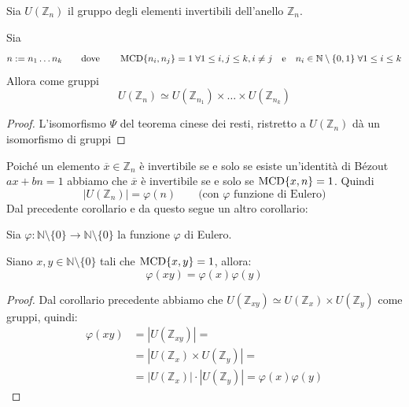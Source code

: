 \documentclass[../main.tex]{subfiles}
\begin{document}
\begin{corollary}
    Sia $U(\mathbb{Z}_n)$ il gruppo degli elementi invertibili dell'anello $\mathbb{Z}_n$.

    Sia
    \[
        n := n_1 \ldots n_k \qquad \text{dove} \qquad \operatorname{MCD}\{n_i, n_j\} = 1 \; \forall 1 \leq i,j \leq k, i \neq j \quad \text{e} \quad n_i \in \mathbb{N} \setminus \{0,1\} \;  \forall 1 \leq i \leq k
    \]
    Allora come gruppi
    \begin{equation*}
        U(\mathbb{Z}_n) \simeq U(\mathbb{Z}_{n_1}) \times \ldots \times U(\mathbb{Z}_{n_k})
    \end{equation*}
\end{corollary}
\begin{proof}
    L'isomorfismo $\Psi$ del teorema cinese dei resti, ristretto a $U(\mathbb{Z}_n)$ dà un isomorfismo di gruppi
\end{proof}

Poiché un elemento $\overline{x} \in \mathbb{Z}_n$ è invertibile se e solo se esiste un'identità di Bézout $ax + bn = 1$ abbiamo che $\overline{x}$ è invertibile se e solo se $\operatorname{MCD}\{x,n\} = 1$. Quindi
\begin{equation*}
    |U(\mathbb{Z}_n)| = \varphi(n) \qquad \text{(con $\varphi$ funzione di Eulero)}
\end{equation*}
Dal precedente corollario e da questo segue un altro corollario:

\begin{corollary}
    Sia $\varphi : \mathbb{N} \setminus \{0\} \rightarrow \mathbb{N} \setminus \{0\}$ la funzione $\varphi$ di Eulero.

    Siano $x,y \in \mathbb{N} \setminus \{0\}$ tali che $\operatorname{MCD}\{x,y\} = 1$, allora:
    \begin{equation*}
        \varphi(xy) = \varphi(x)\varphi(y)
    \end{equation*}
\end{corollary}
\begin{proof}
    Dal corollario precedente abbiamo che $U(\mathbb{Z}_{xy}) \simeq U(\mathbb{Z}_x) \times U(\mathbb{Z}_y)$ come gruppi, quindi:
    \begin{align*}
        \varphi(xy) & = |U(\mathbb{Z}_{xy})| =                                            \\
                    & = |U(\mathbb{Z}_x) \times U(\mathbb{Z}_y)| =                        \\
                    & = |U(\mathbb{Z}_x)| \cdot |U(\mathbb{Z}_y)| = \varphi(x) \varphi(y)
    \end{align*}
\end{proof}
\end{document}
